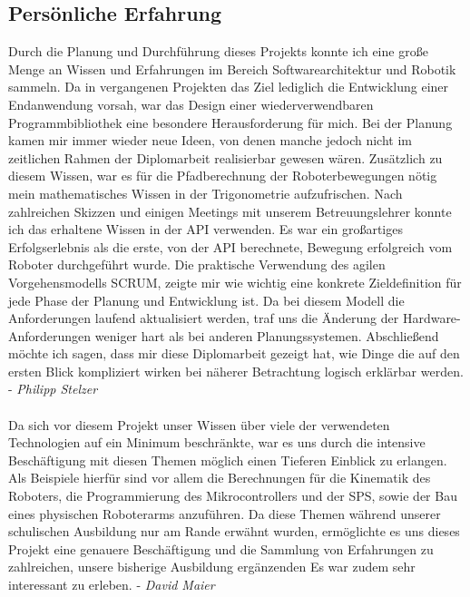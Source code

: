 \subsection{Persönliche Erfahrung}
\par
\begingroup
\leftskip=1cm 
\rightskip=1cm 
\noindent
Durch die Planung und Durchführung dieses Projekts konnte ich eine große Menge an Wissen und Erfahrungen im Bereich Softwarearchitektur und Robotik sammeln. Da in vergangenen Projekten das Ziel lediglich die Entwicklung einer Endanwendung vorsah, war das Design einer wiederverwendbaren Programmbibliothek eine besondere Herausforderung für mich. Bei der Planung kamen mir immer wieder neue Ideen, von denen manche jedoch nicht im zeitlichen Rahmen der Diplomarbeit realisierbar gewesen wären. Zusätzlich zu diesem Wissen, war es für die Pfadberechnung der Roboterbewegungen nötig mein mathematisches Wissen in der Trigonometrie aufzufrischen. Nach zahlreichen Skizzen und einigen Meetings mit unserem Betreuungslehrer konnte ich das erhaltene Wissen in der API verwenden. Es war ein großartiges Erfolgserlebnis als die erste, von der API berechnete, Bewegung erfolgreich vom Roboter durchgeführt wurde. Die praktische Verwendung des agilen Vorgehensmodells SCRUM, zeigte mir wie wichtig eine konkrete Zieldefinition für jede Phase der Planung und Entwicklung ist. Da bei diesem Modell die Anforderungen laufend aktualisiert werden, traf uns die Änderung der Hardware-Anforderungen weniger hart als bei anderen Planungssystemen. Abschließend möchte ich sagen, dass mir diese Diplomarbeit gezeigt hat, wie Dinge die auf den ersten Blick kompliziert wirken bei näherer Betrachtung logisch erklärbar werden. - \textit{Philipp Stelzer}
\\\\
Da sich vor diesem Projekt unser Wissen über viele der verwendeten Technologien auf ein Minimum beschränkte, war es uns durch die intensive Beschäftigung mit diesen Themen möglich einen Tieferen Einblick zu erlangen. Als Beispiele hierfür sind vor allem die Berechnungen für die Kinematik des Roboters, die Programmierung des Mikrocontrollers und der SPS, sowie der Bau eines physischen Roboterarms anzuführen. Da diese Themen während unserer schulischen Ausbildung nur am Rande erwähnt wurden, ermöglichte es uns dieses Projekt eine genauere Beschäftigung und die Sammlung von Erfahrungen zu zahlreichen, unsere bisherige Ausbildung ergänzenden 
Es war zudem sehr interessant zu erleben. - \textit{David Maier}
\par
\endgroup
